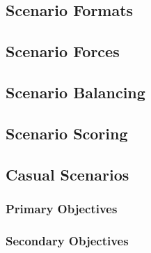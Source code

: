 

\subsection{Scenario Formats}



\subsection{Scenario Forces}



\newpage

\subsection{Scenario Balancing}



\subsection{Scenario Scoring}



\newpage

\subsection{Casual Scenarios}



\subsubsection{Primary Objectives}



\newpage

\subsubsection{Secondary Objectives}


